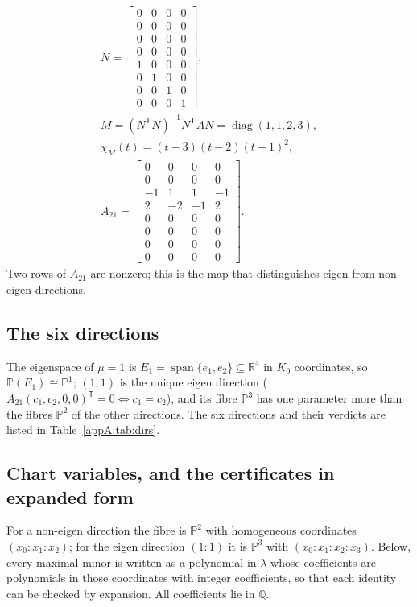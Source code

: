 \begin{gather}
\label{appA:eq:N}
N=\begin{bmatrix}
0&0&0&0\\0&0&0&0\\0&0&0&0\\0&0&0&0\\
1&0&0&0\\0&1&0&0\\0&0&1&0\\0&0&0&1
\end{bmatrix},\\
M=(N^{\mathsf T}N)^{-1}N^{\mathsf T}AN=\operatorname{diag}(1,1,2,3),\\
\label{appA:eq:chi}
\chi_M(t)=(t-3)(t-2)(t-1)^2,\\
A_{21}=\begin{bmatrix}
0&0&0&0\\0&0&0&0\\-1&1&1&-1\\2&-2&-1&2\\
0&0&0&0\\0&0&0&0\\0&0&0&0\\0&0&0&0
\end{bmatrix}.
\end{gather}
Two rows of $A_{21}$ are nonzero; this is the map that distinguishes eigen from non-eigen directions.
\subsection{The six directions}
\label{appA:six}
The eigenspace of $\mu=1$ is $E_1=\operatorname{span}\{e_1,e_2\}\subseteq\mathbb R^4$ in $K_0$
coordinates, so $\mathbb P(E_1)\cong\mathbb P^1$; $(1,1)$ is the unique eigen direction
($A_{21}(c_1,c_2,0,0)^{\mathsf T}=0\iff c_1=c_2$), and its fibre $\mathbb P^3$ has one parameter more
than the fibres $\mathbb P^2$ of the other directions. The six directions and their verdicts are listed
in Table~\ref{appA:tab:dirs}.
\subsection{Chart variables, and the certificates in expanded form}
\label{appA:certificates}
For a non-eigen direction the fibre is $\mathbb P^2$ with homogeneous coordinates $(x_0\!:\!x_1\!:\!x_2)$;
for the eigen direction $(1\!:\!1)$ it is $\mathbb P^3$ with $(x_0\!:\!x_1\!:\!x_2\!:\!x_3)$. Below,
every maximal minor is written as a polynomial in $\lambda$ whose coefficients are polynomials in those
coordinates with integer coefficients, so that each identity can be checked by expansion. All
coefficients lie in $\mathbb Q$.

